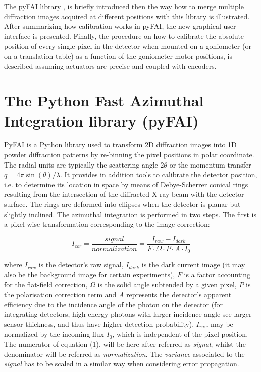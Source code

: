\documentclass[preprint]{iucr}              %
\begin{document}
The pyFAI library \cite{fv5028}, is briefly introduced then the way how to
merge multiple diffraction images acquired at different positions with this
library \cite{PyFAI_PDJ} is illustrated. 
After summarizing how calibration works in pyFAI, the new graphical user
interface is presented.
Finally, the procedure on how to calibrate the absolute position of
every single pixel in the detector when mounted on a goniometer (or on a
translation table) as a function of the goniometer motor positions, is
described assuming actuators are precise and coupled with encoders. 

\section{The Python Fast Azimuthal Integration library (pyFAI)}

PyFAI is a Python \cite{python} library used to transform 2D diffraction images into
1D powder diffraction patterns by re-binning the pixel positions in polar
coordinate. 
The radial units are typically the scattering angle  
$2\theta$ or the momentum transfer $q=4\pi \sin(\theta)/\lambda$.
It provides in addition tools to calibrate the detector position, i.e.
to determine its location in space by means of Debye-Scherrer conical rings
resulting from the intersection of the diffracted X-ray beam with the
detector surface. 
The rings are deformed into ellipses when the detector is planar but 
slightly inclined. 
The azimuthal integration is performed in two steps. 
The first is a pixel-wise
transformation corresponding to the image correction:

\begin{equation}
I_{cor} = \frac{signal}{normalization}  = \frac{I_{raw} - I_{dark}}{F \cdot
\Omega \cdot P \cdot A \cdot I_0} 
\end{equation}

where $I_{raw}$ is the detector's raw signal, $I_{dark}$ is the dark current
image (it may also be the background image for certain experiments), $F$ is a 
factor accounting for the flat-field correction, $\Omega$ is the solid
angle subtended by a given pixel, $P$ is the polarisation correction term and
$A$ represents the detector's apparent efficiency due to the incidence angle of the
photon on the detector (for integrating detectors, high energy photons with
larger incidence angle see larger sensor thickness, and thus have higher
detection probability).
$I_{raw}$ may be normalized by the incoming flux $I_0$, which is
independent of the pixel position.
The numerator of equation (1), will be here after referred as
\textit{signal}, whilst the denominator will be referred as
\textit{normalization}. 
The \textit{variance} associated to the \textit{signal} has to be scaled in a similar way
when considering error propagation.
\end{document}
